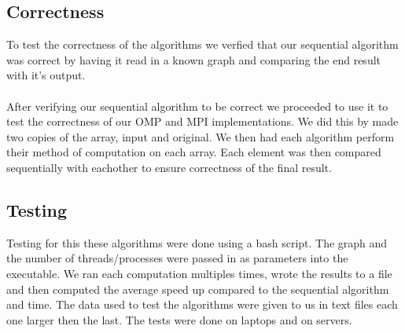 \subsection{Correctness}
To test the correctness of the algorithms we verfied that our sequential algorithm was correct by having it read in a known graph and comparing the end result with it's output. \\\\After verifying our sequential algorithm to be correct we proceeded to use it to test the correctness of our OMP and MPI implementations. We did this by made two copies of the array, input and original. We then had each algorithm perform their method of computation on each array. Each element was then compared sequentially with eachother to ensure correctness of the final result.
\subsection{Testing}
Testing for this these algorithms were done using a bash script. The graph and the number of threads/processes were passed in as parameters into the executable. We ran each computation multiples times, wrote the results to a file and then computed the average speed up compared to the sequential algorithm and time.
The data used to test the algorithms were given to us in text files each one larger then the last.
The tests were done on laptops and on servers.
